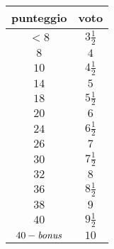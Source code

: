 \documentclass[12pt, a4paper]{exam}
\begin{document}

{\color{cinnabar}
  \begin{center}
  \end{center}
  \begin{center}
    \begin{tabular}{c|c}
      \toprule

      \bf{punteggio} &  \bf{voto}\\[5pt]
      \midrule
      $ < 8$ & $3\frac{1}{2}$ \\[3pt]

      $8$ & $4$ \\[3pt]

      $10$ & $4\frac{1}{2}$ \\[3pt]

      $14$ & $5$ \\[3pt]

      $18$ & $5 \frac{1}{2}$ \\[3pt]

      \large {$20$} & \large{$6$} \\[3pt]

      $24$ & $6 \frac{1}{2}$ \\[3pt]

      $26$ & $7$ \\[3pt]

      $30$ & $7 \frac{1}{2}$ \\[3pt]

      $32$ & $8$ \\[3pt]

      $36$ & $8 \frac{1}{2}$ \\[3pt]

      $38$ & $9$ \\[3pt]

      $40$ & $9 \frac{1}{2}$ \\[3pt]

      $40 - \text{\em bonus}$ & $10$ \\[5pt]

      \bottomrule
    \end{tabular}
  \end{center}
}




\end{document}
